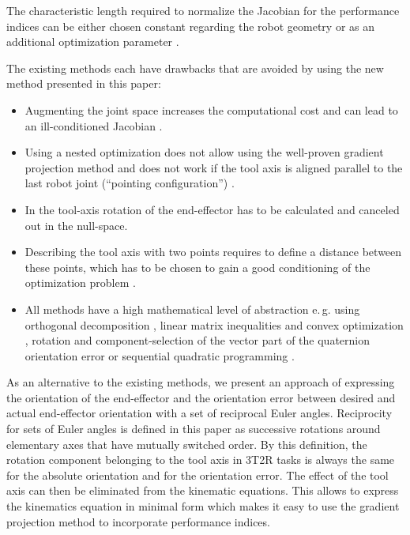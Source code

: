 \documentclass[twocolumn,10pt]{IFTOMM}
\begin{document}
The characteristic length required to normalize the Jacobian for the performance indices can be either chosen constant regarding the robot geometry \cite{ZhuQuCaoYan2013} or as an additional optimization parameter \cite{LegerAng2016}.

The existing methods each have drawbacks that are avoided by using the new method presented in this paper:
\begin{itemize}
    \item Augmenting the joint space \cite{Baron2000} increases the computational cost and can lead to an ill-conditioned Jacobian \cite{HuoBar2008}.
    \item Using a nested optimization \cite{ZhuQuCaoYan2013,GuoDonKe2015} does not allow using the well-proven gradient projection method and does not work if the tool axis is aligned parallel to the last robot joint (``pointing configuration'') \cite{GuoDonKe2015}.
    \item In \cite{Zlajpah2017} the tool-axis rotation of the end-effector has to be calculated and canceled out in the null-space.
    \item Describing the tool axis with two points requires to define a distance between these points, which has to be chosen to gain a good conditioning of the optimization problem \cite{LegerAng2016}.
    \item All methods have a high mathematical level of abstraction e.\,g. using orthogonal decomposition \cite{HuoBar2008}, linear matrix inequalities and convex optimization \cite{FromGra2010}, rotation and component-selection of the vector part of the quaternion orientation error \cite{Zlajpah2017} or sequential quadratic programming \cite{LegerAng2016}.
\end{itemize}

As an alternative to the existing methods, we present an approach of expressing the orientation of the end-effector and the orientation error between desired and actual end-effector orientation with a set of reciprocal Euler angles.
Reciprocity for sets of Euler angles is defined in this paper as successive rotations around elementary axes that have mutually switched order.
By this definition, the rotation component belonging to the tool axis in 3T2R tasks is always the same for the absolute orientation and for the orientation error.
The effect of the tool axis can then be eliminated from the kinematic equations.
This allows to express the kinematics equation in minimal form which makes it easy to use the gradient projection method to incorporate performance indices.
\end{document}
